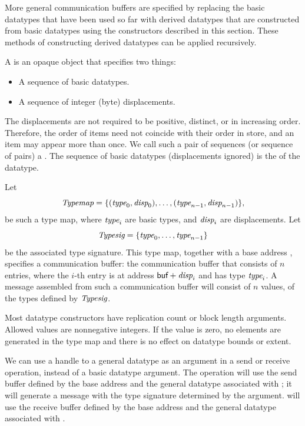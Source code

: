 More general communication buffers are specified by replacing the
basic datatypes that have been used so far with derived datatypes that
are constructed from basic datatypes using the constructors described
in this section.  These methods of constructing derived datatypes can
be applied recursively.

A  is an opaque object that specifies two
things:
\begin{itemize}
\item
A sequence of basic datatypes.
\item
A sequence of integer (byte) displacements.
\end{itemize}

The displacements are not required to be positive, distinct, or
in increasing order. Therefore, the order of items need not
coincide with their order in store, and an item may appear more than
once.
We call such a pair of sequences (or sequence of pairs) a .
The sequence of basic datatypes (displacements ignored) is the  of the datatype.

Let
\[
\textrm{\itshape{Typemap}} = \{ (\textrm{\itshape{type}}_0,\textrm{\itshape{disp}}_0), \ldots , (\textrm{\itshape{type}}_{n-1}, \textrm{\itshape{disp}}_{n-1}) \} ,
\]
be such a type map, where $\textrm{\itshape{type}}_i$ are basic types, and
$\textrm{\itshape{disp}}_i$ are  displacements.
Let
\[
\textrm{\itshape{Typesig}} = \{ \textrm{\itshape{type}}_0 , \ldots , \textrm{\itshape{type}}_{n-1} \}
\]
be the associated type signature.
This type map, together with a base address ,
specifies a communication buffer: the communication buffer that consists of $n$
entries, where the $i$-th entry is at address $\textsf{buf} +
\textrm{\itshape{disp}}_i$ and has type $\textrm{\itshape{type}}_i$.
A message assembled from such a
communication buffer will consist of $n$ values, of the types defined
by $\textrm{\itshape{Typesig}}$.

Most datatype constructors have replication count or block length arguments.
Allowed values are nonnegative integers. If the value is zero, no elements are
generated in the type map and there is no effect on datatype bounds or
extent.

We can use a handle to a general datatype as an argument in a send or
receive operation, instead of a basic datatype argument.  The
operation
 will use the send buffer
defined by the base address  and the general datatype
associated with ; it will generate a message with the type
signature determined by the  argument.
 will use the receive buffer
defined by the base address  and the general datatype
associated with .

